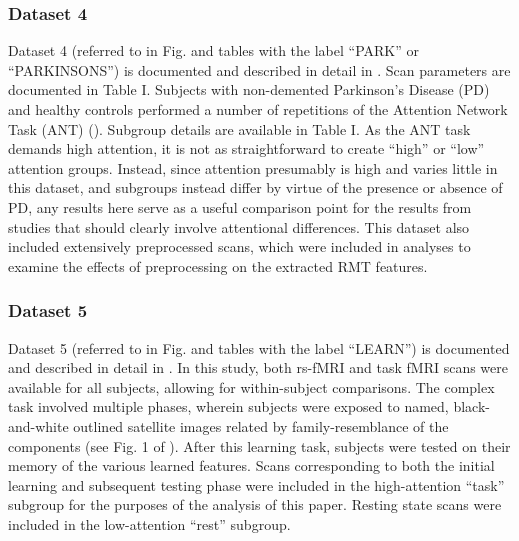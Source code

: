 \subsubsection{Dataset 4}
Dataset 4 (referred to in Fig. and tables with the label ``PARK'' or ``PARKINSONS'') is documented and
described in detail in \cite{madhyasthaDynamicConnectivityRest2015}. Scan parameters are documented
in Table I. Subjects with non-demented Parkinson’s Disease (PD) and healthy controls performed a
number of repetitions of the Attention Network Task (ANT)
(\cite{fanActivationAttentionalNetworks2005}). Subgroup details are available in Table I. As the ANT
task demands high attention, it is not as straightforward to create ``high'' or ``low'' attention
groups. Instead, since attention presumably is high and varies little in this dataset, and subgroups
instead differ by virtue of the presence or absence of PD, any results here serve as a useful
comparison point for the results from studies that should clearly involve attentional differences.
This dataset also included extensively preprocessed scans, which were included in analyses to
examine the effects of preprocessing on the extracted RMT features.

\subsubsection{Dataset 5}
Dataset 5 (referred to in Fig. and tables with the label ``LEARN'') is documented and described in
detail in \cite{schapiroHumanHippocampalReplay2018}. In this study, both rs-fMRI and task fMRI scans
were available for all subjects, allowing for within-subject comparisons. The complex task involved
multiple phases, wherein subjects were exposed to named, black-and-white outlined satellite images
related by family-resemblance of the components (see Fig. 1 of
\cite{schapiroHumanHippocampalReplay2018}). After this learning task, subjects were tested on their
memory of the various learned features. Scans corresponding to both the initial learning and
subsequent testing phase were included in the high-attention ``task'' subgroup for the purposes of the
analysis of this paper. Resting state scans were included in the low-attention ``rest'' subgroup.

